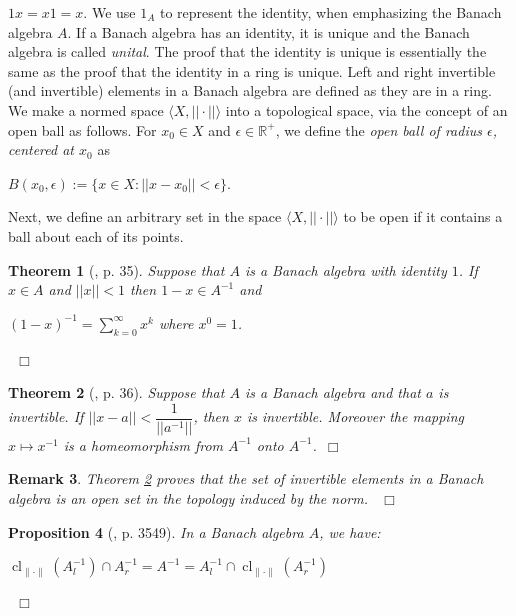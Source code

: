 \documentclass[12pt, oneside]{book}
\newtheorem{theorem}{Theorem}[subsection]
\newtheorem{proposition}[theorem]{Proposition}
\newtheorem{remark}[theorem]{Remark}
\newcommand{\qed}{\hfill ~$\Box$\\}
\def\cl{\operatorname{cl}}
\begin{document}
$1x = x1 = x $. We use $1_A$ to represent the identity, when emphasizing the Banach algebra $A$. 
If a Banach algebra has an identity, it is unique and the Banach algebra is called {\sl unital}. 
The proof that the identity is unique is essentially the same as the proof that the identity in a ring 
is unique. Left and right invertible (and invertible) elements in a Banach algebra are defined as they 
are in a ring.
\vskip 0.3cm
\noindent We make a normed space $\langle X, || \cdot || \rangle$ into a topological space, via the concept of an open ball as follows. For $x_0 \in X$ and $\epsilon \in \mathbb{R}^+$, we define the {\sl open ball of radius $\epsilon$, centered at $x_0$} as 
\begin{center}
$B(x_0, \epsilon):=\{x \in X: || x-x_0 || < \epsilon\}$. 
\end{center}
\noindent Next, we define an arbitrary set in the space $\langle X, || \cdot || \rangle$ to be open if it contains a ball about each of its points. 

\begin{theorem}[\cite{A}, p. 35] \label{oneMinXInvert}
\normalfont
Suppose that $A$ is a Banach algebra with identity $1$. If $x \in A$ and $||x|| < 1$ 
then $1 - x \in A^{-1}$ and
\begin{center}
 $\displaystyle{ (1-x)^{-1}=\sum_{k=0}^{\infty} x^k}$ \quad where $x^0=1$.
\end{center}\qed
\end{theorem}


\begin{theorem}[\cite{A}, p. 36] \label{InvertiblesIsOpen}
\normalfont
Suppose that $A$ is a Banach algebra and that $a$ is invertible. If $||x - a|| < \dfrac{1}{||a^{-1}||}$,
then $x$ is invertible. Moreover the mapping $x \mapsto x^{-1}$ is a homeomorphism from $A^{-1}$ 
onto $A^{-1}$.\qed
\end{theorem} 

\begin{remark}
\normalfont
Theorem \ref{InvertiblesIsOpen} proves that the set of invertible elements in a Banach algebra is an 
open set in the topology induced by the norm. \qed
\end{remark}




\begin{proposition}[\cite{CH2}, p. 3549] \label{IntersectLInvAndRInv}
\normalfont
\noindent In a Banach algebra $A$, we have: 
\begin{center}
$\cl_{\| \cdot \|}(A_l^{-1}) \cap A_r^{-1}=A^{-1}=A_l^{-1} \cap \cl_{\| \cdot \|}(A_r^{-1})$
\end{center}
\qed
\end{proposition}
\end{document}

